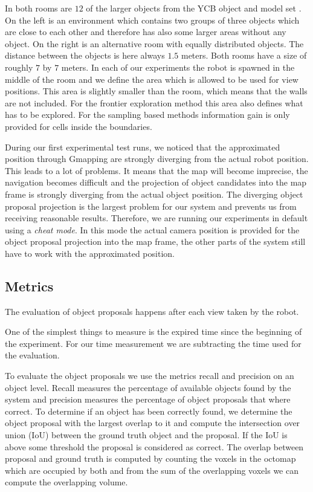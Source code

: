 \documentclass[a4paper,11pt,english]{article}
\begin{document}
In both rooms are $12$ of the larger objects from the YCB object and model set \cite{calli2015benchmarking}.
On the left is an environment which contains two groups of three objects which are close to each other and therefore has also some larger areas without any object.
On the right is an alternative room with equally distributed objects. The distance between the objects is here always $1.5$ meters. Both rooms have a size of roughly $7$ by $7$ meters.
In each of our experiments the robot is spawned in the middle of the room and we define the area which is allowed to be used for view positions. This area is slightly smaller than the room, which means that the walls are not included.
For the frontier exploration method this area also defines what has to be explored.
For the sampling based methods information gain is only provided for cells inside the boundaries.

During our first experimental test runs, we noticed that the approximated position through Gmapping are strongly diverging from the actual robot position.
This leads to a lot of problems. It means that the map will become imprecise, the navigation becomes difficult and the projection of object candidates into the map frame is strongly diverging from the actual object position.
The diverging object proposal projection is the largest problem for our system and prevents us from receiving reasonable results. Therefore, we are running our experiments in default using a \textit{cheat mode}.
In this mode the actual camera position is provided for the object proposal projection into the map frame, the other parts of the system still have to work with the approximated position.

\subsection{Metrics}
The evaluation of object proposals happens after each view taken by the robot.

One of the simplest things to measure is the expired time since the beginning of the experiment.
For our time measurement we are subtracting the time used for the evaluation.

To evaluate the object proposals we use the metrics recall and precision on an object level.
Recall measures the percentage of available objects found by the system and precision measures the percentage of object proposals that where correct.
To determine if an object has been correctly found, we determine the object proposal with the largest overlap to it and compute the intersection over union (IoU) between the ground truth object and the proposal.
If the IoU is above some threshold the proposal is considered as correct.
The overlap between proposal and ground truth is computed by counting the voxels in the octomap which are occupied by both and from the sum of the overlapping voxels we can compute the overlapping volume.
\end{document}
